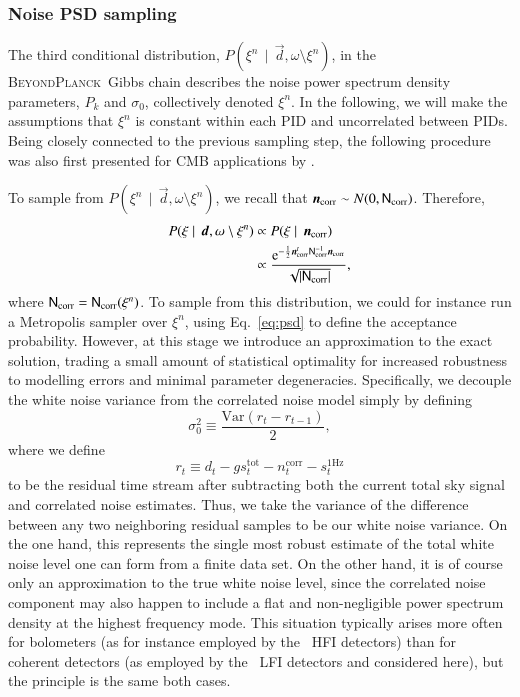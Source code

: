 \documentclass[onecolumn]{aa}
\renewcommand{\d}[0]{\vec{d}}
\newcommand{\n}[0]{\vec{n}}
\newcommand{\N}[0]{\tens{N}}
\newcommand{\BP}{\textsc{BeyondPlanck}}
\newcommand{\e}{\mathrm e}
\begin{document}
\subsubsection{Noise PSD sampling}
\label{sec:ncorr_psd}

The third conditional distribution, $P(\xi^{n}\,\mid \,\d,
\omega\setminus \xi^{n})$, in the \BP\ Gibbs chain describes the noise
power spectrum density parameters, $P_k$ and $\sigma_0$, collectively
denoted $\xi^{n}$. In the following, we will make the assumptions that
$\xi^n$ is constant within each PID and uncorrelated between PIDs.
Being closely connected to the previous sampling step, the following
procedure was also first presented for CMB applications by
\citet{wehus:2012}.

To sample from $P(\xi^{n}\,\mid \,\d, \omega\setminus \xi^{n})$, we
recall that $\n_{\mathrm{corr}}\sim
N(0,\N_{\mathrm{corr}})$. Therefore,
\begin{align}
  P(\xi\mid \,\d, \omega\setminus \xi^{n}) &\propto P(\xi\mid \,\n_{\mathrm{corr}}) \\
  &\propto \frac{\e^{-\frac{1}{2}\n_{\mathrm{corr}}^t\N_{\mathrm{corr}}^{-1}\n_{\mathrm{corr}}}}{\sqrt{|\N_{\mathrm{corr}}|}},
  \label{eq:psd}
\end{align}
where $\N_{\mathrm{corr}}=\N_{\mathrm{corr}}(\xi^n)$. To sample from
this distribution, we could for instance run a Metropolis sampler over
$\xi^n$, using Eq.~\eqref{eq:psd} to define the acceptance
probability.  However, at this stage we introduce an approximation to
the exact solution, trading a small amount of statistical optimality
for increased robustness to modelling errors and minimal parameter
degeneracies. Specifically, we decouple the white noise variance from
the correlated noise model simply by defining
\begin{equation}
\sigma_0^2 \equiv \frac{\mathrm{Var}(r_{t}-r_{t-1})}{2},
\end{equation}
where we define
\begin{equation}
r_t \equiv d_t - g s_t^{\mathrm{tot}} - n_t^{\mathrm{corr}} - s^{\mathrm{1Hz}}_t
\end{equation}
to be the residual time stream after subtracting both the current
total sky signal and correlated noise estimates. Thus, we take the
variance of the difference between any two neighboring residual
samples to be our white noise variance. On the one hand, this
represents the single most robust estimate of the total white noise
level one can form from a finite data set. On the other hand, it is of
course only an approximation to the true white noise level, since the
correlated noise component may also happen to include a flat and
non-negligible power spectrum density at the highest frequency
mode. This situation typically arises more often for bolometers (as
for instance employed by the \Planck\ HFI detectors) than for coherent
detectors (as employed by the \Planck\ LFI detectors and considered
here), but the principle is the same both cases.
\end{document}
